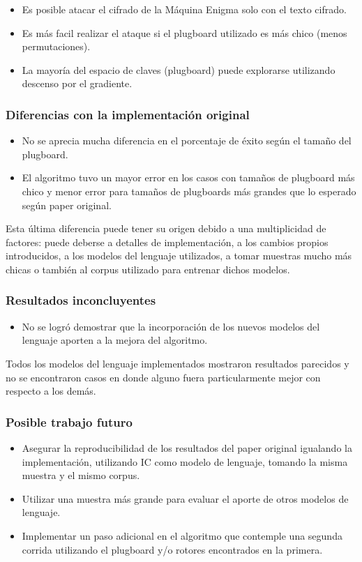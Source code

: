 \documentclass[a4paper,10pt]{article}
\begin{document}
\begin{itemize}
  \item Es posible atacar el cifrado de la Máquina Enigma solo con el texto cifrado.
  \item Es más facil realizar el ataque si el plugboard utilizado es más chico (menos permutaciones).
  \item La mayoría del espacio de claves (plugboard) puede explorarse utilizando descenso por el gradiente.
\end{itemize}

\subsubsection{Diferencias con la implementación original}
\begin{itemize}
  \item No se aprecia mucha diferencia en el porcentaje de éxito según el tamaño del plugboard.
  \item El algoritmo tuvo un mayor error en los casos con tamaños de plugboard más chico y menor error para tamaños de plugboards más grandes que lo esperado según paper original.
\end{itemize}

Esta última diferencia puede tener su origen debido a una multiplicidad de factores: puede deberse a detalles de implementación, a los cambios propios introducidos, a los modelos del lenguaje utilizados, a tomar muestras mucho más chicas o también al corpus utilizado para entrenar dichos modelos.

\subsubsection{Resultados inconcluyentes}
\begin{itemize}
  \item No se logró demostrar que la incorporación de los nuevos modelos del lenguaje aporten a la mejora del algoritmo.
\end{itemize}

Todos los modelos del lenguaje implementados mostraron resultados parecidos y no se encontraron casos en donde alguno fuera particularmente mejor con respecto a los demás.

\subsubsection{Posible trabajo futuro}
\begin{itemize}
  \item Asegurar la reproducibilidad de los resultados del paper original igualando la implementación, utilizando IC como modelo de lenguaje, tomando la misma muestra y el mismo corpus.
  \item Utilizar una muestra más grande para evaluar el aporte de otros modelos de lenguaje.
  \item Implementar un paso adicional en el algoritmo que contemple una segunda corrida utilizando el plugboard y/o rotores encontrados en la primera.
\end{itemize}
\end{document}
